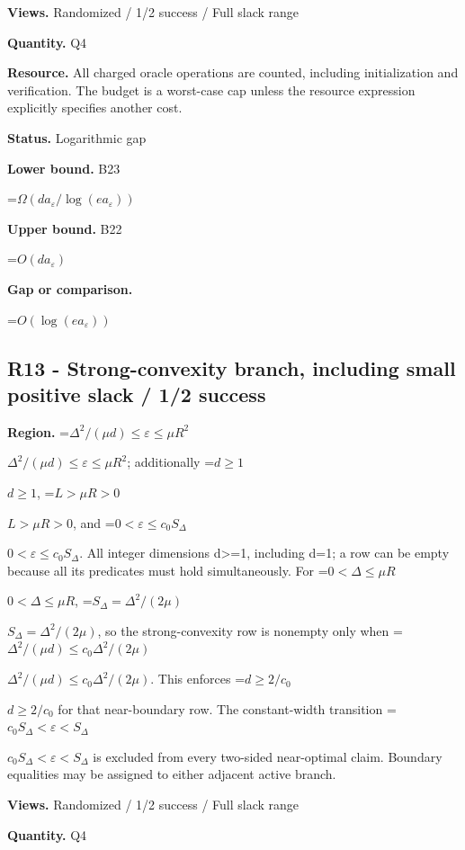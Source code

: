 \documentclass[10pt,a4paper]{article}
\newcommand{\AtlasMath}[1]{\par\begingroup\centering\setbox0=\hbox{$\displaystyle #1$}\ifdim\wd0>1.4\linewidth\typeout{ATLAS WIDE FORMULA: \the\wd0}\fi\ifdim\wd0>\linewidth\resizebox{\linewidth}{!}{\box0}\else\box0\fi\par\endgroup}
\newcommand{\AtlasInlineMath}[1]{\begingroup\setbox0=\hbox{$#1$}\ifdim\wd0>.4\linewidth\endgroup\AtlasMath{#1}\else\endgroup$#1$\fi}
\begin{document}
\textbf{Views.} Randomized / 1/2 success / Full slack range



\textbf{Quantity.} Q4



\textbf{Resource.} All charged oracle operations are counted, including initialization and verification. The budget is a worst-case cap unless the resource expression explicitly specifies another cost.



\textbf{Status.} Logarithmic gap



\textbf{Lower bound.} B23



\AtlasMath{\Omega(da_\varepsilon/\log(ea_\varepsilon))}


\textbf{Upper bound.} B22



\AtlasMath{O(da_\varepsilon)}


\textbf{Gap or comparison.}



\AtlasMath{O(\log(ea_\varepsilon))}


\subsection{R13 - Strong-convexity branch, including small positive slack / 1/2 success}


\textbf{Region.} \AtlasInlineMath{\Delta^2/(\mu d)\le\varepsilon\le\mu R^2}; additionally \AtlasInlineMath{d\ge1}, \AtlasInlineMath{L>\mu R>0}, and \AtlasInlineMath{0<\varepsilon\le c_0S_\Delta}. All integer dimensions d>=1, including d=1; a row can be empty because all its predicates must hold simultaneously. For \AtlasInlineMath{0<\Delta\le\mu R}, \AtlasInlineMath{S_\Delta=\Delta^2/(2\mu)}, so the strong-convexity row is nonempty only when \AtlasInlineMath{\Delta^2/(\mu d)\le c_0\Delta^2/(2\mu)}. This enforces \AtlasInlineMath{d\ge2/c_0} for that near-boundary row. The constant-width transition \AtlasInlineMath{c_0S_\Delta<\varepsilon<S_\Delta} is excluded from every two-sided near-optimal claim. Boundary equalities may be assigned to either adjacent active branch.



\textbf{Views.} Randomized / 1/2 success / Full slack range



\textbf{Quantity.} Q4
\end{document}
